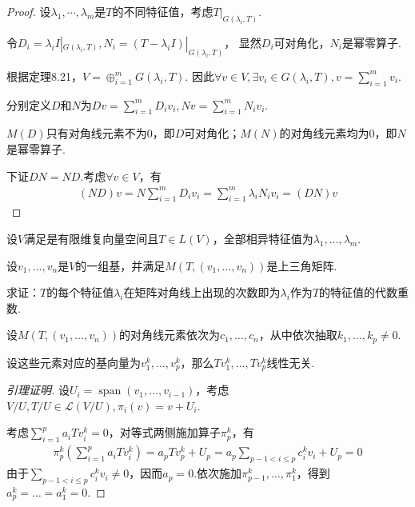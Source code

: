 \begin{proof}
    设\(\lambda_1,\cdots,\lambda_m\)是\(T\)的不同特征值，考虑\(T|_{G(\lambda_i,T)}\).

    令\(D_i=\lambda_i I|_{G(\lambda_i,T)},N_i=(T-\lambda_i I)|_{G(\lambda_i,T)}\)，
    显然\(D_i\)可对角化，\(N_i\)是幂零算子.
    
    根据定理8.21，\(V=\oplus_{i=1}^m G(\lambda_i,T)\).
    因此\(\forall v \in V,\exists v_i \in G(\lambda_i,T),v=\sum_{i=1}^m v_i\).
    
    分别定义\(D\)和\(N\)为\(Dv=\sum_{i=1}^m D_iv_i,Nv=\sum_{i=1}^m N_iv_i\).
    
    \(M(D)\)只有对角线元素不为\(0\)，即\(D\)可对角化；\(M(N)\)的对角线元素均为\(0\)，即\(N\)是幂零算子.
    
    下证\(DN=ND\).考虑\(\forall v \in V\)，有
        \begin{align*}
            (ND)v=N\sum_{i=1}^m D_iv_i=\sum_{i=1}^m \lambda_iN_iv_i=(DN)v
        \end{align*}
\end{proof}

\begin{problem}[11]\label{8.B.11}
    设\(V\)满足是有限维复向量空间且\(T \in L(V)\)，全部相异特征值为\(\lambda_1, \dots, \lambda_m\).

    设\(v_1, \dots, v_n\)是\(V\)的一组基，并满足\(M(T,(v_1, \dots, v_n))\)是上三角矩阵.
    
    求证：\(T\)的每个特征值\(\lambda_i\)在矩阵对角线上出现的次数即为\(\lambda_i\)作为\(T\)的特征值的代数重数.
\end{problem}

\begin{lemma}
    设\(M(T,(v_1, \dots, v_n))\)的对角线元素依次为\(c_1, \dots, c_n\)，从中依次抽取\(k_1, \dots, k_p \ne 0\).

    设这些元素对应的基向量为\(v_1^k, \dots, v_p^k\)，那么\(Tv_1^k, \dots, Tv_p^k\)线性无关.
\end{lemma}

\begin{proof}[引理证明]
    设\(U_i=\operatorname{span}(v_1, \dots, v_{i-1})\)，考虑\(V/U, T/U \in \mathcal{L}(V/U), \pi_i(v)=v+U_i\).

    考虑\(\sum_{i=1}^p a_iTv_i^k=0\)，对等式两侧施加算子\(\pi_p^k\)，有
    \begin{align*}
        \pi_p^k(\sum_{i=1}^p a_iTv_i^k)=a_pTv_p^k+U_p=a_p\sum_{p-1<i \leq p}c_i^k v_i+U_p=0
    \end{align*}
    由于\(\sum_{p-1<i \leq p}c_i^k v_i \ne 0\)，因而\(a_p=0\).依次施加\(\pi_{p-1}^k, \dots, \pi_1^k\)，得到\(a_p^k=\dots=a_1^k=0\).
\end{proof}

